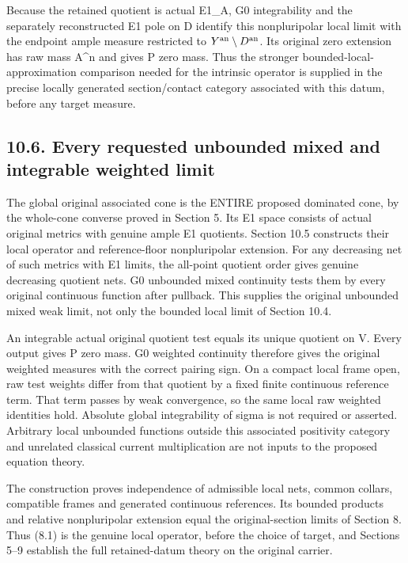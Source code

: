 \documentclass[
  10pt,
]{article}
\begin{document}
Because the retained quotient is actual E1\_A, G0 integrability and the
separately reconstructed E1 pole on D identify this nonpluripolar local
limit with the endpoint ample measure restricted to
\(Y^{\rm an}\setminus D^{\rm an}\). Its original zero extension has raw
mass A\^{}n and gives P zero mass. Thus the stronger
bounded-local-approximation comparison needed for the intrinsic operator
is supplied in the precise locally generated section/contact category
associated with this datum, before any target measure.

\subsection{10.6. Every requested unbounded mixed and integrable
weighted
limit}\label{every-requested-unbounded-mixed-and-integrable-weighted-limit}

The global original associated cone is the ENTIRE proposed dominated
cone, by the whole-cone converse proved in Section 5. Its E1 space
consists of actual original metrics with genuine ample E1 quotients.
Section 10.5 constructs their local operator and reference-floor
nonpluripolar extension. For any decreasing net of such metrics with E1
limits, the all-point quotient order gives genuine decreasing quotient
nets. G0 unbounded mixed continuity tests them by every original
continuous function after pullback. This supplies the original unbounded
mixed weak limit, not only the bounded local limit of Section 10.4.

An integrable actual original quotient test equals its unique quotient
on V. Every output gives P zero mass. G0 weighted continuity therefore
gives the original weighted measures with the correct pairing sign. On a
compact local frame open, raw test weights differ from that quotient by
a fixed finite continuous reference term. That term passes by weak
convergence, so the same local raw weighted identities hold. Absolute
global integrability of sigma is not required or asserted. Arbitrary
local unbounded functions outside this associated positivity category
and unrelated classical current multiplication are not inputs to the
proposed equation theory.

The construction proves independence of admissible local nets, common
collars, compatible frames and generated continuous references. Its
bounded products and relative nonpluripolar extension equal the
original-section limits of Section 8. Thus (8.1) is the genuine local
operator, before the choice of target, and Sections 5--9 establish the
full retained-datum theory on the original carrier.
\end{document}
